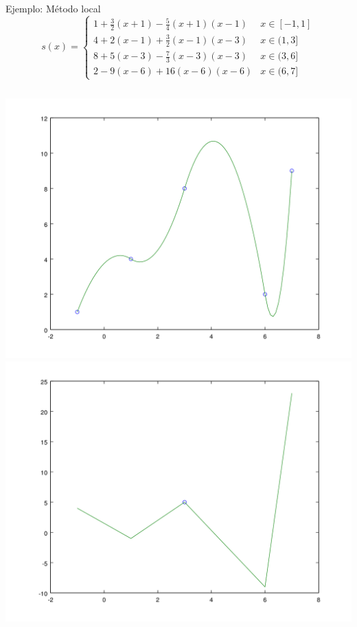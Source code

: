 \documentclass[compress]{beamer}
\theoremstyle{definition}
\begin{document}
\begin{frame}{Ejemplo: Método local}
\begin{equation*}
s(x)=
\begin{cases}
1+\frac{3}{2}(x+1)-\frac{5}{4}(x+1)(x-1) & x\in [-1,1]\\
4+2(x-1)+\frac{3}{2}(x-1)(x-3) & x\in (1,3]\\
8+5(x-3)- \frac{7}{3} (x-3)(x-3) & x\in (3,6]\\
2 -9(x-6)+16(x-6)(x-6) & x\in (6,7]
\end{cases}
\end{equation*}

\vfill

\begin{columns}
\includegraphics[width=\textwidth]{EjemploLocal.png}
\includegraphics[width=\textwidth]{EjemploLocalDer.png}
\end{columns}
\end{frame}
\end{document}
